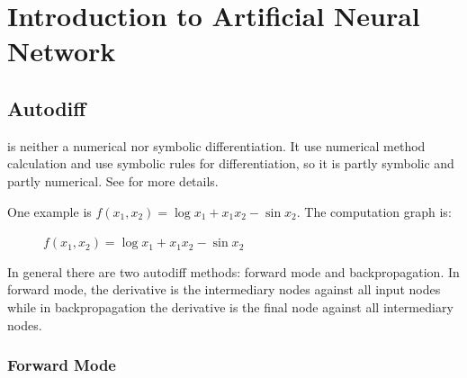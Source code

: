 \section{Introduction to Artificial Neural Network}



\subsection{Autodiff}

 is neither a numerical nor symbolic differentiation. It use numerical method calculation and use symbolic rules for differentiation, so it is partly symbolic and partly numerical. See \cite{GunesBaydin2018} for more details.


One example is $f(x_1, x_2) = \log{x_1} + x_1 x_2 - \sin{x_2}$. The computation graph is:

\begin{figure}[H]
\centering	
{}
\caption{$f(x_1, x_2) = \log{x_1} + x_1 x_2 - \sin{x_2}$}
\end{figure}


In general there are two autodiff methods: forward mode and backpropagation. In forward mode, the derivative is the intermediary nodes against all input nodes while in backpropagation the derivative is the final node against all intermediary nodes.



\subsubsection{Forward Mode}

